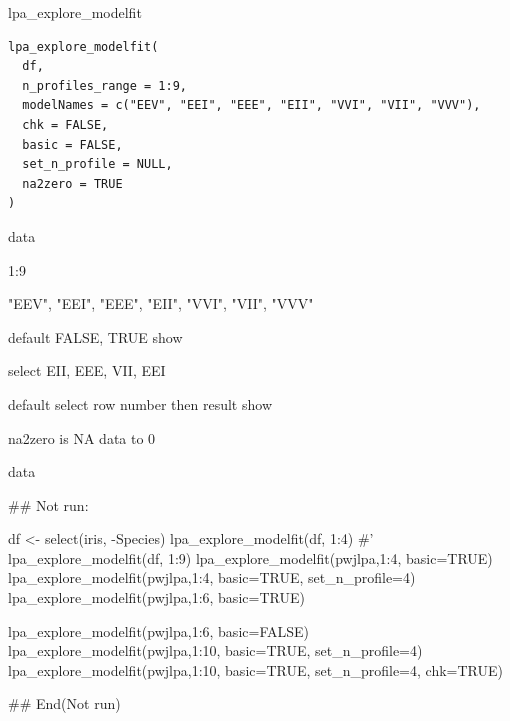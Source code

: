 \documentclass[a4paper]{book}
\begin{document}
%
\begin{Description}
lpa\_explore\_modelfit
\end{Description}
%
\begin{Usage}
\begin{verbatim}
lpa_explore_modelfit(
  df,
  n_profiles_range = 1:9,
  modelNames = c("EEV", "EEI", "EEE", "EII", "VVI", "VII", "VVV"),
  chk = FALSE,
  basic = FALSE,
  set_n_profile = NULL,
  na2zero = TRUE
)
\end{verbatim}
\end{Usage}
%
\begin{Arguments}
\begin{ldescription}
\item[\code{df}] data

\item[\code{n\_profiles\_range}] 1:9

\item[\code{modelNames}] "EEV", "EEI", "EEE", "EII", "VVI", "VII", "VVV"

\item[\code{chk}] default FALSE, TRUE show

\item[\code{basic}] select EII, EEE, VII, EEI

\item[\code{set\_n\_profile}] default select row number then result show

\item[\code{na2zero}] na2zero is NA data to 0
\end{ldescription}
\end{Arguments}
%
\begin{Value}
data
\end{Value}
%
\begin{Examples}
\begin{ExampleCode}

\#\# Not run: 

df <- select(iris, -Species)
lpa_explore_modelfit(df, 1:4)
#' lpa_explore_modelfit(df, 1:9)
lpa_explore_modelfit(pwjlpa,1:4, basic=TRUE)
lpa_explore_modelfit(pwjlpa,1:4, basic=TRUE, set_n_profile=4)
lpa_explore_modelfit(pwjlpa,1:6, basic=TRUE)

lpa_explore_modelfit(pwjlpa,1:6, basic=FALSE)
lpa_explore_modelfit(pwjlpa,1:10, basic=TRUE, set_n_profile=4)
lpa_explore_modelfit(pwjlpa,1:10, basic=TRUE, set_n_profile=4, chk=TRUE)


## End(Not run)

\end{ExampleCode}
\end{Examples}
\end{document}
